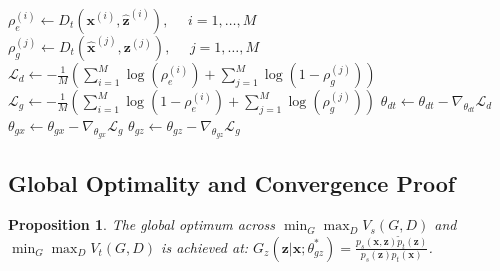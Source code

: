 \documentclass{article}
\newtheorem{prop}{Proposition}
\begin{document}
\begin{algorithm}[h!]
\begin{algorithmic}
	\STATE $\rho_e^{(i)} \leftarrow D_t(\bm{x}^{(i)}, \hat{\bm{z}}^{(i)}), \ \ \ \ \ \ i = 1, \dots, M $ 
	\STATE $\rho_g^{(j)} \leftarrow D_t(\hat{\bm{x}}^{(j)}, \bm{z}^{(j)}), \ \ \ \ \ \ j = 1, \dots, M $
	\STATE $\mathcal{L}_d \leftarrow -\frac{1}{M} \left( \sum_{i=1}^{M} \log \left( \rho_e^{(i)} \right) + \sum_{j=1}^{M} \log \left( 1 - \rho_g^{(j)} \right) \right)$
	\STATE $\mathcal{L}_g \leftarrow -\frac{1}{M} \left( \sum_{i=1}^{M} \log \left( 1 - \rho_e^{(i)} \right) + \sum_{j=1}^{M} \log \left(\rho_g^{(j)} \right) \right)$
	\STATE $\theta_{dt} \leftarrow \theta_{dt} - \nabla_{\theta_{dt}}\mathcal{L}_d$
	\STATE $\theta_{gx} \leftarrow \theta_{gx} - \nabla_{\theta_{gx}}\mathcal{L}_g$
	\STATE $\theta_{gz} \leftarrow \theta_{gz} - \nabla_{\theta_{gz}}\mathcal{L}_g$
	\ENDFOR
\end{algorithmic}
\end{algorithm}

\subsection{Global Optimality and Convergence Proof}

\begin{prop}

The global optimum across $\min_{G} \max_{D} V_s(G, D)$ and $\min_{G} \max_{D} V_t(G, D)$ is achieved at: $G_z(\bm{z}|\bm{x}; \theta_{gz}^*) = \frac{p_s(\bm{x},\bm{z})\widetilde{p}_t(\bm{z})}{p_s(\bm{z})p_t(\bm{x})}$.
\end{prop}
\end{document}
